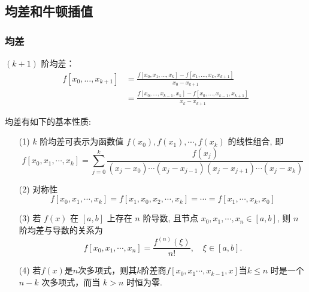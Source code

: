 \subsection{均差和牛顿插值}

\subsubsection{均差}

$(k+1)$ 阶均差：
$$
\begin{aligned}
f\left[x_{0}, \ldots, x_{k+1}\right] &=\frac{f\left[x_{0}, x_{1}, \ldots, x_{k}\right]-f\left[x_{1}, \ldots, x_{k}, x_{k+1}\right]}{x_{0}-x_{k+1}} \\
&=\frac{f\left[x_{0}, \ldots, x_{k-1}, x_{k}\right]-f\left[x_{0}, \ldots, x_{k-1}, x_{k+1}\right]}{x_{k}-x_{k+1}}
\end{aligned}
$$

均差有如下的基本性质:
\begin{enumerate}
  \item[(1)] $k$ 阶均差可表示为函数值 $f\left(x_{0}\right), f\left(x_{1}\right), \cdots, f\left(x_{k}\right)$ 的线性组合, 即
  $$
  f\left[x_{0}, x_{1}, \cdots, x_{k}\right]=\sum_{j=0}^{k} \frac{f\left(x_{j}\right)}{\left(x_{j}-x_{0}\right) \cdots\left(x_{j}-x_{j-1}\right)\left(x_{j}-x_{j+1}\right) \cdots\left(x_{j}-x_{k}\right)}
  $$
  \item[(2)]对称性
  $$
  f\left[x_{0}, x_{1}, \cdots, x_{k}\right]=f\left[x_{1}, x_{0}, x_{2}, \cdots, x_{k}\right]=\cdots=f\left[x_{1}, \cdots, x_{k}, x_{0}\right]
  $$
  \item[(3)]  若 $f(x)$ 在 $[a, b]$ 上存在 $n$ 阶导数, 且节点 $x_{0}, x_{1}, \cdots, x_{n} \in[a, b]$, 则 $n$ 阶均差与导数的关系为
  $$
  f\left[x_{0}, x_{1}, \cdots, x_{n}\right]=\frac{f^{(n)}(\xi)}{n !}, \quad \xi \in[a, b] .
  $$
  \item[(4)] 若$f\left(x\right)$是$n$次多项式，则其$k$阶差商$f\left[x_{0}, x_{1} \cdots, x_{k-1}, x\right]$当$k \leq n$ 时是一个 $n-k$ 次多项式，而当 $k>n$ 时恒为零.
\end{enumerate}

